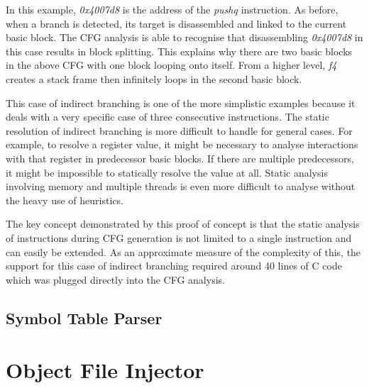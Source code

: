 In this example, \emph{0x4007d8} is the address of the \emph{pushq} instruction. As before, when a branch is detected, its target is disassembled and linked to the current basic block. The CFG analysis is able to recognise that disassembling \emph{0x4007d8} in this case results in block splitting. This explains why there are two basic blocks in the above CFG with one block looping onto itself. From a higher level, \emph{f4} creates a stack frame then infinitely loops in the second basic block.

This case of indirect branching is one of the more simplistic examples because it deals with a very specific case of three consecutive instructions. The static resolution of indirect branching is more difficult to handle for general cases. For example, to resolve a register value, it might be necessary to analyse interactions with that register in predecessor basic blocks. If there are multiple predecessors, it might be impossible to statically resolve the value at all. Static analysis involving memory and multiple threads is even more difficult to analyse without the heavy use of heuristics.

The key concept demonstrated by this proof of concept is that the static analysis of instructions during CFG generation is not limited to a single instruction and can easily be extended. As an approximate measure of the complexity of this, the support for this case of indirect branching required around 40 lines of C code which was plugged directly into the CFG analysis.

\subsection{Symbol Table Parser}\label{sec:Symbol_Table}

%
%
%
%
%
%

\section{Object File Injector}
